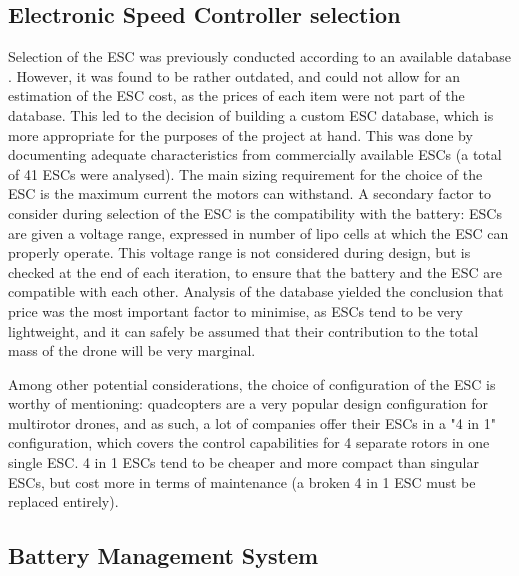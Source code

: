 
\subsection{Electronic Speed Controller selection}

Selection of the ESC was previously conducted according to an available database \cite{midterm,drive_calculator}. However, it was found to be rather outdated, and could not allow for an estimation of the ESC cost, as the prices of each item were not part of the database. This led to the decision of building a custom ESC database, which is more appropriate for the purposes of the project at hand. This was done by documenting adequate characteristics from commercially available ESCs (a total of 41 ESCs were analysed). The main sizing requirement for the choice of the ESC is the maximum current the motors can withstand. A secondary factor to consider during selection of the ESC is the compatibility with the battery: ESCs are given a voltage range, expressed in number of lipo cells at which the ESC can properly operate. This voltage range is not considered during design, but is checked at the end of each iteration, to ensure that the battery and the ESC are compatible with each other. Analysis of the database yielded the conclusion that price was the most important factor to minimise, as ESCs tend to be very lightweight, and it can safely be assumed that their contribution to the total mass of the drone will be very marginal.

Among other potential considerations, the choice of configuration of the ESC is worthy of mentioning: quadcopters are a very popular design configuration for multirotor drones, and as such, a lot of companies offer their ESCs in a "4 in 1" configuration, which covers the control capabilities for 4 separate rotors in one single ESC. 4 in 1 ESCs tend to be cheaper and more compact than singular ESCs, but cost more in terms of maintenance (a broken 4 in 1 ESC must be replaced entirely).

\subsection{Battery Management System}

